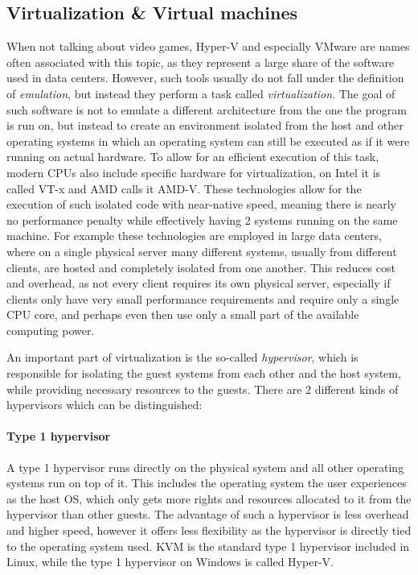 \subsection{Virtualization \& Virtual machines}
When not talking about video games, Hyper-V and especially VMware are names often associated with this topic,
as they represent a large share of the software used in data centers\cite{VMware}.
However, such tools usually do not fall under the definition of \emph{emulation},
but instead they perform a task called \emph{virtualization}.
The goal of such software is not to emulate a different architecture from the one the program is run on,
but instead to create an environment isolated from the host and other operating systems in which an operating system can still
be executed as if it were running on actual hardware.
To allow for an efficient execution of this task, modern CPUs also include specific hardware for virtualization,
on Intel it is called VT-x and AMD calls it AMD-V.
These technologies allow for the execution of such isolated code with near-native speed,
meaning there is nearly no performance penalty while effectively having 2 systems running on the same machine.
For example these technologies are employed in large data centers,
where on a single physical server many different systems, usually from different clients,
are hosted and completely isolated from one another.
This reduces cost and overhead, as not every client requires its own physical server,
especially if clients only have very small performance requirements and require only a single CPU core,
and perhaps even then use only a small part of the available computing power.

An important part of virtualization is the so-called \emph{hypervisor},
which is responsible for isolating the guest systems from each other and the host system,
while providing necessary resources to the guests\cite{hypervisor}.
There are 2 different kinds of hypervisors which can be distinguished:

\paragraph{Type 1 hypervisor} A type 1 hypervisor runs directly on the physical system
and all other operating systems run on top of it.
This includes the operating system the user experiences as the host OS,
which only gets more rights and resources allocated to it from the hypervisor than other guests.
The advantage of such a hypervisor is less overhead and higher speed,
however it offers less flexibility as the hypervisor is directly tied to the operating system used.
KVM is the standard type 1 hypervisor included in Linux,
while the type 1 hypervisor on Windows is called Hyper-V\cite{hypervisor}.

